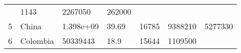 \documentclass[
]{article}
\begin{document}
\begin{longtable}[]{@{}lllllll@{}}
\begin{minipage}[t]{0.13\columnwidth}
\end{minipage} & \begin{minipage}[t]{0.09\columnwidth}\raggedright
1143\strut
\end{minipage} & \begin{minipage}[t]{0.12\columnwidth}\raggedright
2267050\strut
\end{minipage} & \begin{minipage}[t]{0.12\columnwidth}\raggedright
262000\strut
\end{minipage}\tabularnewline
\begin{minipage}[t]{0.06\columnwidth}\raggedright
5\strut
\end{minipage} & \begin{minipage}[t]{0.15\columnwidth}\raggedright
China\strut
\end{minipage} & \begin{minipage}[t]{0.13\columnwidth}\raggedright
1.398e+09\strut
\end{minipage} & \begin{minipage}[t]{0.13\columnwidth}\raggedright
39.69\strut
\end{minipage} & \begin{minipage}[t]{0.09\columnwidth}\raggedright
16785\strut
\end{minipage} & \begin{minipage}[t]{0.12\columnwidth}\raggedright
9388210\strut
\end{minipage} & \begin{minipage}[t]{0.12\columnwidth}\raggedright
5277330\strut
\end{minipage}\tabularnewline
\begin{minipage}[t]{0.06\columnwidth}\raggedright
6\strut
\end{minipage} & \begin{minipage}[t]{0.15\columnwidth}\raggedright
Colombia\strut
\end{minipage} & \begin{minipage}[t]{0.13\columnwidth}\raggedright
50339443\strut
\end{minipage} & \begin{minipage}[t]{0.13\columnwidth}\raggedright
18.9\strut
\end{minipage} & \begin{minipage}[t]{0.09\columnwidth}\raggedright
15644\strut
\end{minipage} & \begin{minipage}[t]{0.12\columnwidth}\raggedright
1109500\strut
\end{minipage} & \begin{minipage}[t]{0.12\columnwidth}\raggedright

\end{minipage}
\end{longtable}
\end{document}
